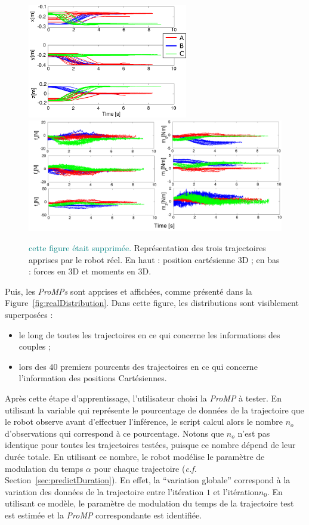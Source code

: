 \documentclass[utf8]{frontiersSCNS} %
\newcommand{\ori}[1]{\textcolor{teal}{#1}}
\begin{document}
\begin{figure}[h]
\centering
\includegraphics[height = 5cm]{img/realTrajectories2.pdf} \includegraphics[width=\hsize]{img/realTrajectoriesv2.pdf} 
\caption{\ori{cette figure était supprimée.} Représentation des trois trajectoires apprises par le robot réel. En haut : position cartésienne 3D ; en bas : forces en 3D et moments en 3D.}
\label{fig:realTraj}
\end{figure}

Puis, les \textit{ProMPs} sont apprises et affichées, comme présenté dans la Figure~\ref{fig:realDistribution}.
Dans cette figure, les distributions sont visiblement superposées :
\begin{itemize}
\item le long de toutes les trajectoires en ce qui concerne les informations des couples ;
\item lors des $40$ premiers pourcents des trajectoires en ce qui concerne l'information des positions Cartésiennes.
\end{itemize}
Après cette étape d'apprentissage, l'utilisateur choisi la \textit{ProMP} à tester. En utilisant la variable qui représente le pourcentage de données de la trajectoire que le robot observe avant d'effectuer l'inférence, le script calcul alors le nombre $n_o$ d'observations qui correspond à ce pourcentage. Notons que $n_o$ n'est pas identique pour toutes les trajectoires testées, puisque ce nombre dépend de leur durée totale. En utilisant ce nombre, le robot modélise le paramètre de modulation du temps $\alpha$ pour chaque trajectoire (\textit{c.f.} Section~\ref{sec:predictDuration}). En effet, la ``variation globale'' correspond à la variation des données de la trajectoire entre l'itération $1$ et l'itération$n_0$. En utilisant ce modèle, le paramètre de modulation du temps de la trajectoire test est estimée et la \textit{ProMP} correspondante est identifiée.
\end{document}
